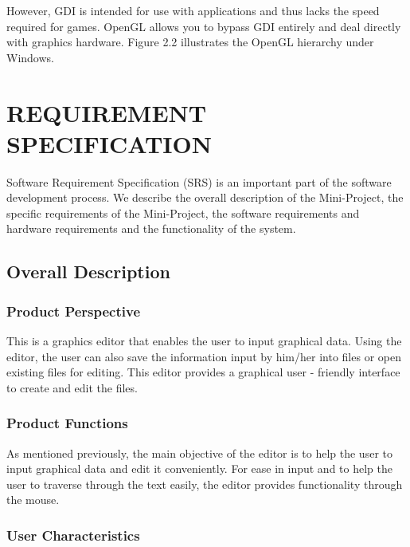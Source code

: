 \documentclass[12pt]{report}
\begin{document}
 However, GDI is intended for use with applications and thus lacks the speed required for games. OpenGL allows you to bypass GDI entirely and deal directly with graphics hardware. Figure 2.2 illustrates the OpenGL hierarchy under Windows. 

\pagestyle{fancy}
\chead{}
\rfoot{\small{\thepage}}
\renewcommand{\headrulewidth}{0.4pt}
\renewcommand{\footrulewidth}{0.4pt}

\chapter{REQUIREMENT SPECIFICATION}
Software Requirement Specification (SRS) is an important part of the  software development process. We describe the overall description of the Mini-Project, the specific requirements of the Mini-Project, the software requirements and hardware requirements and the functionality of the system.
\section{Overall Description}
\subsection{Product Perspective}

This is a graphics editor that enables the user to input graphical data.  Using the editor, the user can also save the information input by him/her into files or open existing files for editing.  This editor provides a graphical user - friendly interface to create and edit the files. 

\subsection{Product Functions}

As mentioned previously, the main objective of the editor is to help the user to input graphical data and edit it conveniently. For ease in input and to help the user to traverse through the text easily, the editor provides functionality through the mouse. 

\subsection{User Characteristics}
\end{document}
